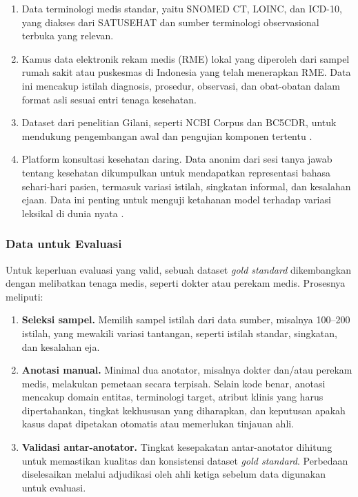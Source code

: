 \begin{enumerate}
    \item Data terminologi medis standar, yaitu SNOMED CT, LOINC, dan ICD-10, yang diakses dari SATUSEHAT dan sumber terminologi observasional terbuka yang relevan.
    \item Kamus data elektronik rekam medis (RME) lokal yang diperoleh dari sampel rumah sakit atau puskesmas di Indonesia yang telah menerapkan RME. Data ini mencakup istilah diagnosis, prosedur, observasi, dan obat-obatan dalam format asli sesuai entri tenaga kesehatan.
    \item Dataset dari penelitian Gilani, seperti NCBI Corpus dan BC5CDR, untuk mendukung pengembangan awal dan pengujian komponen tertentu \citep{gilani_cde-mapper_2025}.
    \item Platform konsultasi kesehatan daring. Data anonim dari sesi tanya jawab tentang kesehatan dikumpulkan untuk mendapatkan representasi bahasa sehari-hari pasien, termasuk variasi istilah, singkatan informal, dan kesalahan ejaan. Data ini penting untuk menguji ketahanan model terhadap variasi leksikal di dunia nyata \citep{purwitasari_comparison_2023}.
\end{enumerate}

\subsubsection{Data untuk Evaluasi}

Untuk keperluan evaluasi yang valid, sebuah dataset \textit{gold standard} dikembangkan dengan melibatkan tenaga medis, seperti dokter atau perekam medis. Prosesnya meliputi:

\begin{enumerate}
    \item \textbf{Seleksi sampel.} Memilih sampel istilah dari data sumber, misalnya 100--200 istilah, yang mewakili variasi tantangan, seperti istilah standar, singkatan, dan kesalahan eja.
    \item \textbf{Anotasi manual.} Minimal dua anotator, misalnya dokter dan/atau perekam medis, melakukan pemetaan secara terpisah. Selain kode benar, anotasi mencakup domain entitas, terminologi target, atribut klinis yang harus dipertahankan, tingkat kekhususan yang diharapkan, dan keputusan apakah kasus dapat dipetakan otomatis atau memerlukan tinjauan ahli.
    \item \textbf{Validasi antar-anotator.} Tingkat kesepakatan antar-anotator dihitung untuk memastikan kualitas dan konsistensi dataset \textit{gold standard}. Perbedaan diselesaikan melalui adjudikasi oleh ahli ketiga sebelum data digunakan untuk evaluasi.
\end{enumerate}

